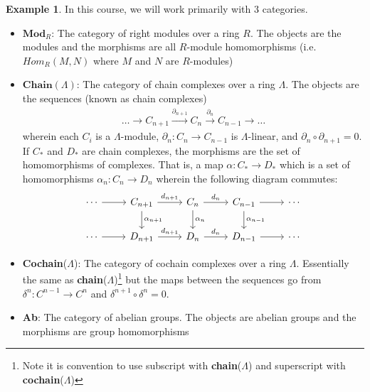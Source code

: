 \documentclass[12pt]{book}
\theoremstyle{definition}
\newtheorem{example}[theorem]{Example}
\begin{document}
\begin{example}
    In this course, we will work primarily with 3 categories. 
    \begin{itemize}
        \item $\textbf{Mod}_R$: The category of right modules over a ring $R$. The objects are the modules and the morphisms are all $R$-module homomorphisms (i.e. $Hom_R(M,N)$ where $M$ and $N$ are $R$-modules)
        \item $\textbf{Chain}(\Lambda)$: The category of chain complexes over a ring $\Lambda$. The objects are the sequences (known as chain complexes)
        \begin{align*}
            \dots \rightarrow C_{n+1} \xrightarrow{\partial_{n+1}} C_n \xrightarrow{\partial_n} C_{n-1} \rightarrow \dots
        \end{align*}
        wherein each $C_i$ is a $\Lambda$-module, $\partial_n : C_n \rightarrow C_{n-1}$ is $\Lambda$-linear, and $\partial_n \circ \partial_{n+1} = 0$.\\
        If $C_*$ and $D_*$ are chain complexes, the morphisms are the set of homomorphisms of complexes. That is, a map $\alpha : C_* \rightarrow D_*$ which is a set of homomorphisms $\alpha_n : C_n \rightarrow D_n$ wherein the following diagram commutes: 
        \[
        \begin{tikzcd}
        \cdots \arrow[r] 
        & C_{n+1} \arrow[r, "d_{n+1}"] \arrow[d, "\alpha_{n+1}"] 
        & C_n \arrow[r, "d_n"] \arrow[d, "\alpha_n"] 
        & C_{n-1} \arrow[r] \arrow[d, "\alpha_{n-1}"] 
        & \cdots \\
        \cdots \arrow[r] 
        & D_{n+1} \arrow[r, "d_{n+1}"] 
        & D_n \arrow[r, "d_n"] 
        & D_{n-1} \arrow[r] 
        & \cdots
        \end{tikzcd}
        \]
        \item \textbf{Cochain}($\Lambda$): The category of cochain complexes over a ring $\Lambda$. Essentially the same as \textbf{chain}($\Lambda$)\footnote{Note it is convention to use subscript with \textbf{chain}($\Lambda$) and superscript with \textbf{cochain}($\Lambda$) } but the maps between the sequences go from $\delta^n : C^{n-1} \rightarrow C^n$ and $\delta^{n+1} \circ \delta^n = 0$. 
        \item \textbf{Ab}: The category of abelian groups. The objects are abelian groups and the morphisms are group homomorphisms
    \end{itemize}
\end{example}
\end{document}
